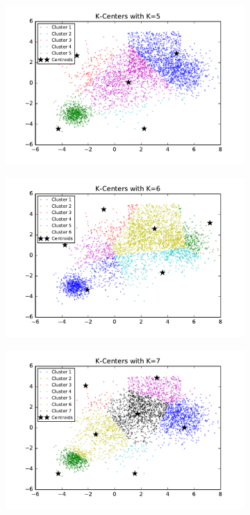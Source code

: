 \begin{figure}[htb]
\begin{subfigure}[b]{0.475\textwidth}
            \includegraphics[width=\textwidth]{./figures/bigClustering_kCenter_5.pdf}
        \end{subfigure}
        \hfill
        \begin{subfigure}[b]{0.475\textwidth}   
            \centering 
            \includegraphics[width=\textwidth]{./figures/bigClustering_kCenter_6.pdf}
        \end{subfigure}
        \begin{subfigure}[b]{0.475\textwidth}   
            \centering 
            \includegraphics[width=\textwidth]{./figures/bigClustering_kCenter_7.pdf}

\end{subfigure}
\end{figure}

